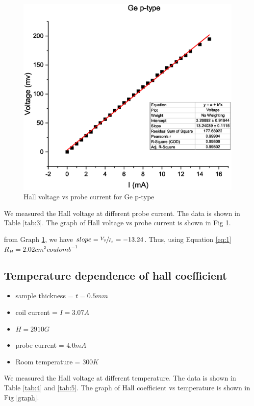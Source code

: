 			
			\begin{figure}[h]
				\centering
				\includegraphics[width=0.9\columnwidth]{images/gep.eps}
				\caption{Hall voltage vs probe current for Ge p-type}
				\label{graph:3}
			\end{figure}

			We measured the Hall voltage at different probe current. The data is shown in Table \ref{tab:3}. The graph of Hall voltage vs probe current is shown in Fig \ref{graph:3}.

			from Graph \ref{graph:3}, we have $slope=\sfrac{V_y}{I_x}=-13.24$. Thus, using Equation \ref{eq:1} $ R_H=2.02 cm^3 coulomb^{-1}$
	\subsection{Temperature dependence of hall coefficient}
		\begin{itemize}
			\item sample thickness = $t=0.5mm$
			\item coil current = $I=3.07A$
			\item $H=2910G$
			\item probe current = $4.0 mA$
			\item Room temperature = $300K$
		\end{itemize}

		We measured the Hall voltage at different temperature. The data is shown in Table \ref{tab:4} and \ref{tab:5}. The graph of Hall coefficient vs temperature is shown in Fig \ref{graph}.

